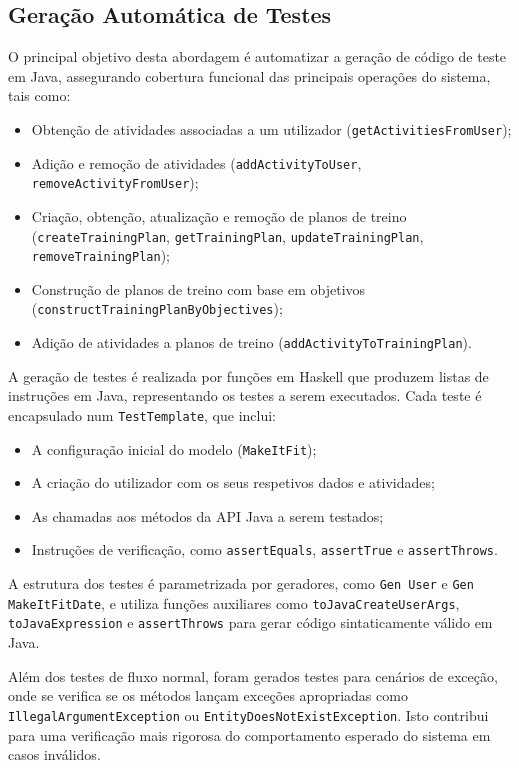 \documentclass[12pt, a4paper]{article}
\begin{document}
\subsection{Geração Automática de Testes}

O principal objetivo desta abordagem é automatizar a geração de código de teste em Java, assegurando
cobertura funcional das principais operações do sistema, tais como:

\begin{itemize}
  \item Obtenção de atividades associadas a um utilizador (\texttt{getActivitiesFromUser});
  \item Adição e remoção de atividades (\texttt{addActivityToUser},
  \texttt{removeActivityFromUser});
  \item Criação, obtenção, atualização e remoção de planos de treino (\texttt{createTrainingPlan},
  \texttt{getTrainingPlan}, \texttt{updateTrainingPlan}, \texttt{removeTrainingPlan});
  \item Construção de planos de treino com base em objetivos
  (\texttt{constructTrainingPlanByObjectives});
  \item Adição de atividades a planos de treino (\texttt{addActivityToTrainingPlan}).
\end{itemize}

A geração de testes é realizada por funções em Haskell que produzem listas de instruções em Java,
representando os testes a serem executados. Cada teste é encapsulado num \texttt{TestTemplate}, que
inclui:

\begin{itemize}
  \item A configuração inicial do modelo (\texttt{MakeItFit});
  \item A criação do utilizador com os seus respetivos dados e atividades;
  \item As chamadas aos métodos da API Java a serem testados;
  \item Instruções de verificação, como \texttt{assertEquals}, \texttt{assertTrue} e
  \texttt{assertThrows}.
\end{itemize}

A estrutura dos testes é parametrizada por geradores, como \texttt{Gen User} e
\texttt{Gen MakeItFitDate}, e utiliza funções auxiliares como \texttt{toJavaCreateUserArgs},
\texttt{toJavaExpression} e \texttt{assertThrows} para gerar código sintaticamente válido em Java.

Além dos testes de fluxo normal, foram gerados testes para cenários de exceção, onde se verifica se
os métodos lançam exceções apropriadas como \texttt{IllegalArgumentException} ou
\texttt{EntityDoesNotExistException}. Isto contribui para uma verificação mais rigorosa do
comportamento esperado do sistema em casos inválidos.
\end{document}
